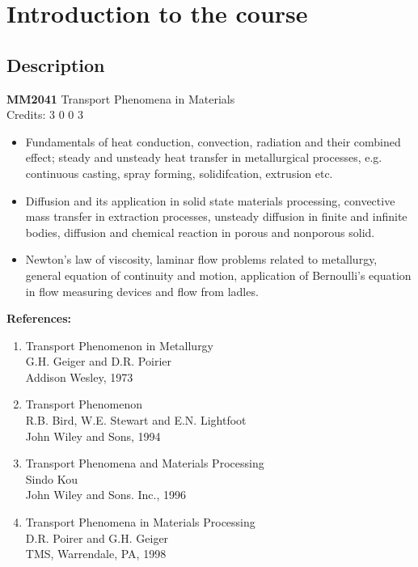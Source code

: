 \chapter{Introduction to the course}

\section{Description}

{\bf MM2041} Transport Phenomena in Materials \\
Credits: 3 0 0 3

\begin{itemize}
\item Fundamentals of heat conduction, convection, radiation and their combined effect; steady and unsteady heat transfer in metallurgical processes, e.g. continuous casting, spray forming, solidifcation, extrusion etc.

\item Diffusion and its application in solid state materials processing, convective mass transfer in extraction processes, unsteady diffusion in finite and infinite bodies, diffusion and chemical reaction in porous and nonporous solid. 

\item Newton's law of viscosity, laminar flow problems related to metallurgy, general equation of continuity and motion, application of Bernoulli's equation in flow measuring devices and flow from ladles. 
\end{itemize} 

{\bf References:}

\begin{enumerate}
\item Transport Phenomenon in Metallurgy \\
G.H. Geiger and D.R. Poirier\\
Addison Wesley, 1973
\item Transport Phenomenon \\
R.B. Bird, W.E. Stewart and E.N. Lightfoot\\
John Wiley and Sons, 1994 
\item Transport Phenomena and Materials Processing\\
Sindo Kou \\
John Wiley and Sons. Inc., 1996 
\item Transport Phenomena in Materials Processing\\
D.R. Poirer and G.H. Geiger\\
TMS, Warrendale, PA, 1998
\end{enumerate} 


